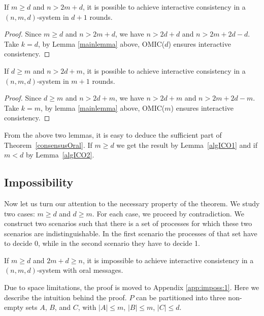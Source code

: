 \begin{lemma}\label{algICO1}
  If $m \geqslant d$ and $n>2m+d$, it is possible to achieve interactive consistency in a $(n,m,d)$-system 
  in $d+1$ rounds.
\end{lemma}

\begin{proof}
  Since $m \geqslant d$ and $n>2m+d$, we have $n>2d+d$ and $n >2m+2d-d$. Take
  $k=d$, by Lemma \ref{mainlemma} above, OMIC($d$) ensures
  interactive consistency. 
\end{proof}

\begin{lemma}\label{algICO2}
  If $d \geqslant m$ and $n>2d+m$, it is possible to achieve interactive consistency in a $(n,m,d)$-system 
 in $m+1$ rounds.
\end{lemma}

\begin{proof}
  Since $d \geqslant m$ and $n>2d+m$, we have $n>2d+m$ and $n >2m+2d-m$. Take
  $k=m$, by lemma \ref{mainlemma} above, OMIC($m$) ensures
  interactive consistency.
\end{proof}

From the above two lemmas, it is easy to deduce the sufficient part of 
Theorem~\ref{consensusOral}. 
If $m \geqslant d$ we get the result by Lemma~\ref{algICO1} and  if $m<d$ by Lemma~\ref{algICO2}.



\subsection{Impossibility}\label{oralImpossibility}

Now let us turn our attention to the necessary property of the theorem. We study two cases: $m \geqslant d$
and $d \geqslant m$. For each case, we proceed by contradiction.
We construct two scenarios such that there is a set of processes for which these two scenarios are indistinguishable. 
In the first scenario the processes of that set have to decide 0, while in the second scenario they have to decide 1.






\begin{lemma}\label{imposs:1}
  If $m \geqslant d$ and $ 2m+d \geqslant n$, it is impossible to achieve interactive consistency in a $(n,m,d)$-system with oral messages.
  \end{lemma}

Due to space limitations, the proof is moved to Appendix \ref{app:imposs:1}. Here we describe the intuition behind the proof.
  $P$ can be partitioned into three non-empty sets $A$, $B$, and $C$,
  with $| A | \leqslant m$, $| B | \leqslant m$, $| C | \leqslant d$. 
  
